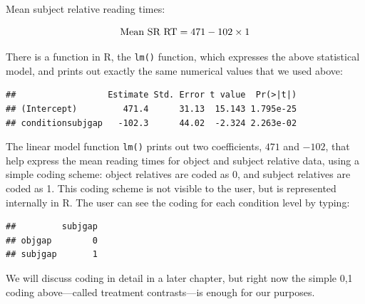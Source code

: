 \documentclass[12pt,]{krantz}
\newenvironment{Shaded}{\begin{snugshade}}{\end{snugshade}}
\newcommand{\CommentTok}[1]{\textcolor[rgb]{0.56,0.35,0.01}{\textit{#1}}}
\newcommand{\KeywordTok}[1]{\textcolor[rgb]{0.13,0.29,0.53}{\textbf{#1}}}
\newcommand{\NormalTok}[1]{#1}
\newcommand{\OperatorTok}[1]{\textcolor[rgb]{0.81,0.36,0.00}{\textbf{#1}}}
\newcommand{\StringTok}[1]{\textcolor[rgb]{0.31,0.60,0.02}{#1}}
\begin{document}
Mean subject relative reading times:

\begin{equation}
\hbox{Mean SR RT} = 471 - 102\times 1 
\end{equation}

There is a function in R, the \texttt{lm()} function, which expresses the above statistical model, and prints out exactly the same numerical values that we used above:

\begin{Shaded}
\end{Shaded}

\begin{verbatim}
##                  Estimate Std. Error t value  Pr(>|t|)
## (Intercept)         471.4      31.13  15.143 1.795e-25
## conditionsubjgap   -102.3      44.02  -2.324 2.263e-02
\end{verbatim}

The linear model function \texttt{lm()} prints out two coefficients, \(471\) and \(-102\), that help express the mean reading times for object and subject relative data, using a simple coding scheme: object relatives are coded as 0, and subject relatives are coded as 1. This coding scheme is not visible to the user, but is represented internally in R. The user can see the coding for each condition level by typing:

\begin{Shaded}
\end{Shaded}

\begin{verbatim}
##         subjgap
## objgap        0
## subjgap       1
\end{verbatim}

We will discuss coding in detail in a later chapter, but right now the simple 0,1 coding above---called treatment contrasts---is enough for our purposes.
\end{document}
